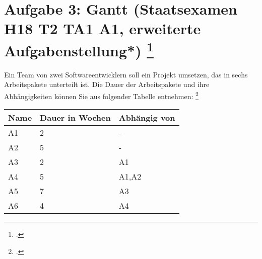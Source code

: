 \documentclass{lehramt-informatik-minimal}
\begin{document}
\section{Aufgabe 3: Gantt (Staatsexamen H18 T2 TA1 A1, erweiterte
Aufgabenstellung*)
\footcite[Seite 2]{sosy:ab:5}}

Ein Team von zwei Softwareentwicklern soll ein Projekt umsetzen, das in
sechs Arbeitspakete unterteilt ist. Die Dauer der Arbeitspakete und ihre
Abhängigkeiten können Sie aus folgender Tabelle entnehmen:
\footcite{examen:66116:2018:09}

\begin{center}
\begin{tabular}{|l|l|l|}
\hline
Name & Dauer in Wochen & Abhängig von\\\hline\hline
A1 & 2 & - \\\hline
A2 & 5 & - \\\hline
A3 & 2 & A1 \\\hline
A4 & 5 & A1,A2 \\\hline
A5 & 7 & A3 \\\hline
A6 & 4 & A4 \\\hline
\end{tabular}
\end{center}
\end{document}
